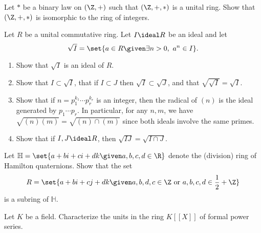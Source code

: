 \begin{problem}
Let \( * \) be a binary law on \( (\Z, +) \) such that \( (\Z, +, *) \) is a unital ring.
Show that \( (\Z, +, *) \) is isomorphic to the ring of integers.
\end{problem}

\begin{problem}
Let \( R \) be a unital commutative ring.
Let \( I \ideal R \) be an ideal and let
\[ \sqrt I = \set{a \in R \given \exists n > 0,\ a^n \in I}. \]
\begin{enumerate}[1]
\item
Show that \( \sqrt I \) is an ideal of \( R \).
\item
Show that \( I \subset \sqrt I \), that if \( I \subset J \) then \( \sqrt I \subset \sqrt J \), and that \( \sqrt{\sqrt I} = \sqrt I \).
\item
Show that if \( n = p_1^{k_1} \cdots p_r^{k_r} \) is an integer, then the radical of \( (n) \) is the ideal generated by \( p_1 \cdots p_r \).
In particular, for any \( n, m \), we have \( \sqrt{(n)(m)} = \sqrt{(n) \cap (m)} \) since both ideals involve the same primes.
\item
Show that if \( I, J \ideal R \), then \( \sqrt{IJ} = \sqrt{I \cap J} \).
\end{enumerate}
\end{problem}

\begin{problem}
Let \( \mathbb H = \set{a + bi + ci + dk \given a, b, c, d \in \R} \) denote the (division) ring of Hamilton quaternions.
Show that the set
\[ R = \set{a + bi + cj + dk \given a,b,d,c \in \Z \text{ or } a,b,c,d \in \frac 1 2 + \Z} \]
is a subring of \( \mathbb H \).
\end{problem}

\begin{problem}
Let \( K \) be a field.
Characterize the units in the ring \( K[[X]] \) of formal power series.
\end{problem}

